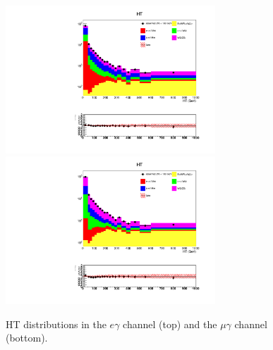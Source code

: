 \documentclass[thesis.tex]{subfiles}
\renewcommand\_{\textunderscore\allowbreak}
\begin{document}
\begin{figure}
  \centering
    \includegraphics[width=0.7\textwidth]{Figures/VALID_egamma_2016ReMiniAOD_HT.pdf} \\
    \includegraphics[width=0.7\textwidth]{Figures/VALID_mg_2016ReMiniAOD_HT.pdf} \\
  \caption{HT distributions in the $e\gamma$ channel (top) and the $\mu\gamma$ channel (bottom).}
    \label{fig:htvalidation}
\end{figure}
\end{document}
